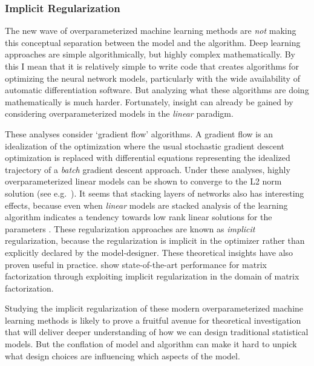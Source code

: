 \documentclass[a4paperpaper,]{article}
\begin{document}
\hypertarget{implicit-regularization}{%
\subsubsection{Implicit Regularization}\label{implicit-regularization}}

The new wave of overparameterized machine learning methods are
\emph{not} making this conceptual separation between the model and the
algorithm. Deep learning approaches are simple algorithmically, but
highly complex mathematically. By this I mean that it is relatively
simple to write code that creates algorithms for optimizing the neural
network models, particularly with the wide availability of automatic
differentiation software. But analyzing what these algorithms are doing
mathematically is much harder. Fortunately, insight can already be
gained by considering overparameterized models in the \emph{linear}
paradigm.

These analyses consider `gradient flow' algorithms. A gradient flow is
an idealization of the optimization where the usual stochastic gradient
descent optimization \citep{Robbins:stoch51} is replaced with
differential equations representing the idealized trajectory of a
\emph{batch} gradient descent approach. Under these analyses, highly
overparameterized linear models can be shown to converge to the L2 norm
solution (see e.g.~\citet{Soudry-implicit18}). It seems that stacking
layers of networks also has interesting effects, because even when
\emph{linear} models are stacked analysis of the learning algorithm
indicates a tendency towards low rank linear solutions for the
parameters \citep{Arora-convergence19}. These regularization approaches
are known as \emph{implicit} regularization, because the regularization
is implicit in the optimizer rather than explicitly declared by the
model-designer. These theoretical insights have also proven useful in
practice. \citet{Arora-implicit19} show state-of-the-art performance for
matrix factorization through exploiting implicit regularization in the
domain of matrix factorization.

Studying the implicit regularization of these modern overparameterized
machine learning methods is likely to prove a fruitful avenue for
theoretical investigation that will deliver deeper understanding of how
we can design traditional statistical models. But the conflation of
model and algorithm can make it hard to unpick what design choices are
influencing which aspects of the model.
\end{document}
